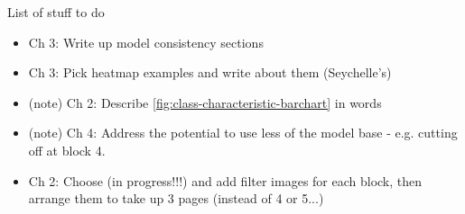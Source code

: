 
List of stuff to do

\begin{itemize}

\item Ch 3: Write up model consistency sections
\item Ch 3: Pick heatmap examples and write about them (Seychelle's)

\item (\fix note) Ch 2: Describe \autoref{fig:class-characteristic-barchart} in words
\item (\fix note) Ch 4: Address the potential to use less of the model base - e.g. cutting off at block 4.
\item Ch 2: Choose (in progress!!!) and add filter images for each block, then arrange them to take up 3 pages (instead of 4 or 5...)

\end{itemize}
